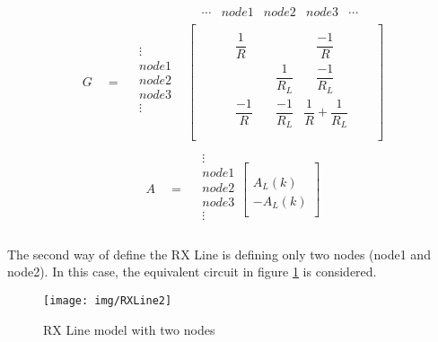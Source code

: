 \begin{align}
\begin{split}
&
\begin{matrix}
& \cdots & node1 & node2 &  node3 & \cdots
\end{matrix}\\[-6pt]
G \quad = \quad
\begin{matrix}
\vdots\\[8pt]
node1\\[8pt]
node2\\[8pt]
node3\\[8pt]
\vdots\\
\end{matrix}
&
\begin{bmatrix}
	\quad & \quad &  \\[8pt]
	\quad & \quad \dfrac{1}{R} & \quad & \quad \dfrac{-1}{R} & \quad  \\[8pt]
	\quad & \quad & \quad \dfrac{1}{R_L} & \quad \dfrac{-1}{R_L} & \quad \\[8pt]
	\quad & \quad \dfrac{-1}{R} & \quad \dfrac{-1}{R_L} & \dfrac{1}{R}+\dfrac{1}{R_L} & \quad\\[8pt]
	\quad\\ 
\end{bmatrix}
\end{split}
\end{align}
\begin{align}
\begin{split}
A\quad = \quad
\begin{matrix}
\vdots\\[8pt]
node1\\[8pt]
node2\\[8pt]
node3\\[8pt]
\vdots\\
\end{matrix}
\begin{bmatrix}
	\quad \\[8pt]
	\quad \\[8pt]
	A_L(k) \\[8pt]
	-A_L(k) \\[8pt]
	\quad
\end{bmatrix}
\end{split}
\end{align}

The second way of define the RX Line is defining only two nodes (node1 and node2). In this case, the equivalent circuit in figure \ref{fig:RxLine2} is considered.

\begin{figure}[ht]
	\centering
	\texttt{[image: img/RXLine2]} 
	\caption{RX Line model with two nodes}
	\label{fig:RxLine2}
\end{figure}

